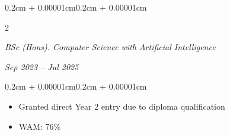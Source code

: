 \documentclass[10pt, letterpaper]{article}
\newenvironment{highlights}{
    \begin{itemize}[
        topsep=0.10cm,
        parsep=0.10cm,
        partopsep=0pt,
        itemsep=0pt,
        leftmargin=0.4cm + 10pt
    ]
}{
    \end{itemize}
}
\newenvironment{onecolentry}{
    \begin{adjustwidth}{0.2cm + 0.00001cm}{0.2cm + 0.00001cm}
}{
    \end{adjustwidth}
}
\newenvironment{twocolentry}[2][]{
    \onecolentry
    \def\secondColumn{#2}
    \setcolumnwidth{\fill, 5.2cm}
    \begin{paracol}{2}
}{
    \switchcolumn \raggedleft \secondColumn
    \end{paracol}
    \endonecolentry
}
\newenvironment{projectentry}{
    \needspace{2.5\baselineskip}
}{
}
\begin{document}
    \begin{projectentry}
    \begin{twocolentry}{
        \textit{Sep 2023 -- Jul 2025}
    }
        \textit{BSc (Hons). Computer Science with Artificial Intelligence}
    \end{twocolentry}
    \vspace{0.10cm}
    \begin{onecolentry}
        \begin{highlights}
            \item Granted direct Year 2 entry due to diploma qualification
            \item WAM: 76\%
        \end{highlights}
    \end{onecolentry}
    \end{projectentry}

    \vspace{0.2cm}
\end{document}
